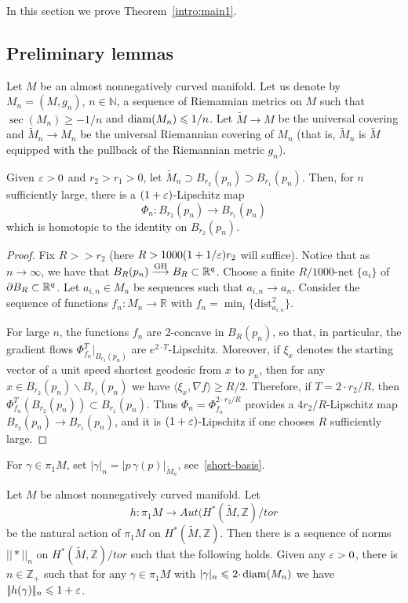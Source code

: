 \documentclass{amsart}
\begin{document}
In this section we prove Theorem~\ref{intro:main1}.



\subsection{Preliminary lemmas}
Let $M$ be an almost nonnegatively curved manifold.
Let us denote by $M_n=(M,g_n)$, $n\in \mathbb{N}$,
a sequence of Riemannian metrics on $M$ such that $\sec(M_n)\ge -1/n$
and $\operatorname{\rm diam}(M_n)\leqslant 1/n$.
Let $\tilde M\to M$ be the universal covering  and 
$\tilde M_n\to M_n$ be
the universal Riemannian covering of $M_n$
(that is, $\tilde M_n$ is
$\tilde M$ equipped with the pullback of the Riemannian metric $g_n$).


\begin{klem}\label{l:key} Given $\varepsilon>0$ and $r_2>r_1>0$,
let
$\tilde M_n\supset B_{r_2}(p_n)\supset B_{r_1}(p_n)$.
Then, for $n$ sufficiently large,
there is a  $(1+\varepsilon)$-Lipschitz map
\[\Phi_n\colon B_{r_2}(p_n)\to B_{r_1}(p_n)\]
which is homotopic to the identity on $B_{r_2}(p_n)$.
\end{klem}

\begin{proof} Fix $R>\!\!>r_2$
(here $R>1000(1+1/\varepsilon)r_2$ will suffice).
Notice that as $n\to\infty$, we have that $B_R(p_n)\GHto B_R\subset \mathbb{R}^q$.
Choose a finite $R/1000$-net $\{a_i\}$ of $\partial B_R\z\subset \mathbb{R}^q$.
Let $a_{i,n}\in M_n$ be sequences such that $a_{i,n} \to a_n$.
Consider the sequence of functions
$f_n\colon M_n\to \mathbb{R}$ with $f_n=\min_i\{\text{dist}^2_{a_{i,n}}\}$.

For large $n$, the functions $f_n$ are $2$-concave in $B_R(p_n)$,
so that, in particular, the gradient flows
$\Phi_{f_n}^T|_{B_{r_2}(p_n)}$ are $e^{2{\cdot} T}$-Lipschitz.
Moreover, if $\xi_x$ denotes
the starting vector of a unit speed shortest geodesic from $x$ to $p_n$,
then  for any $x\in B_{r_2}(p_n) \backslash B_{r_1}(p_n)$
we have $\langle\xi_x,\nabla f \rangle\ge R/2$.
Therefore, if $T=2{\cdot} r_2/R$, then $\Phi_{f_n}^T(B_{r_2}(p_n) )\subset B_{r_1}(p_n)$.
Thus $\Phi_n=\Phi_{f_n}^{2{\cdot} r_2/R}$ provides a
$4r_2/R$-Lipschitz map $B_{r_2}(p_n)\to B_{r_1}(p_n)$,
and it is $(1+\varepsilon)$-Lipschitz if one chooses $R$ sufficiently large.
\end{proof}

For $\gamma\in \pi_1M$, set $|\gamma|_n=|p\,\gamma(p)|_{\tilde M_n}$, see~\ref{short-basis}.

\begin{cor}\label{cor:norm} Let $M$ be almost nonnegatively curved manifold.
Let $$h\colon \pi_1M\to Aut(H^*(\tilde M,\mathbb{Z})/tor$$
be the natural  action of $\pi_1M$ on $H^*(\tilde M,\mathbb{Z})$.
Then there is a sequence of norms $|\!|*|\!|_n$ on
$H^*(\tilde M,\mathbb{Z})/tor$
such that the following holds.
Given any $\varepsilon>0$, there is $n\in \mathbb{Z}_+$
such that for any  $\gamma\in \pi_1M$
with $|\gamma|_n\leqslant 2{\cdot} \operatorname{\rm diam}(M_n)$ we have  $|\!|h(\gamma)|\!|_n\leqslant 1+\varepsilon$.

\end{cor}
\end{document}
